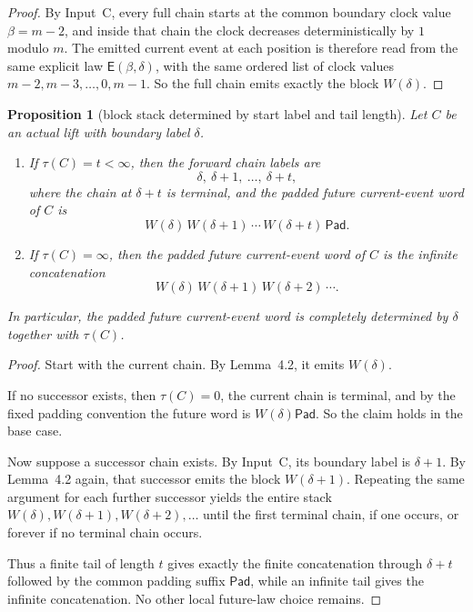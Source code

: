 \documentclass[11pt]{article}
\newtheorem{proposition}[theorem]{Proposition}
\newcommand{\Pad}{\mathsf{Pad}}
\newcommand{\Ev}{\mathsf E}
\begin{document}
\begin{proof}
By Input~C, every full chain starts at the common boundary clock value
$\beta=m-2$, and inside that chain the clock decreases deterministically by $1$
modulo $m$. The emitted current event at each position is therefore read from
the same explicit law $\Ev(\beta,\delta)$, with the same ordered list of clock
values $m-2,m-3,\dots,0,m-1$. So the full chain emits exactly the block
$W(\delta)$.
\end{proof}

\begin{proposition}[block stack determined by start label and tail length]
Let $C$ be an actual lift with boundary label $\delta$.
\begin{enumerate}[label=\textup{(\arabic*)},leftmargin=2.5em]
\item If $\tau(C)=t<\infty$, then the forward chain labels are
      \[
      \delta,\ \delta+1,\ \dots,\ \delta+t,
      \]
      where the chain at $\delta+t$ is terminal, and the padded future
      current-event word of $C$ is
      \[
      W(\delta)\,W(\delta+1)\,\cdots\,W(\delta+t)\,\Pad.
      \]
\item If $\tau(C)=\infty$, then the padded future current-event word of $C$ is
      the infinite concatenation
      \[
      W(\delta)\,W(\delta+1)\,W(\delta+2)\,\cdots.
      \]
\end{enumerate}
In particular, the padded future current-event word is completely determined by
$\delta$ together with $\tau(C)$.
\end{proposition}

\begin{proof}
Start with the current chain. By Lemma~4.2, it emits $W(\delta)$.

If no successor exists, then $\tau(C)=0$, the current chain is terminal, and by
the fixed padding convention the future word is $W(\delta)\Pad$. So the claim
holds in the base case.

Now suppose a successor chain exists. By Input~C, its boundary label is
$\delta+1$. By Lemma~4.2 again, that successor emits the block $W(\delta+1)$.
Repeating the same argument for each further successor yields the entire stack
$W(\delta),W(\delta+1),W(\delta+2),\dots$ until the first terminal chain, if
one occurs, or forever if no terminal chain occurs.

Thus a finite tail of length $t$ gives exactly the finite concatenation through
$\delta+t$ followed by the common padding suffix $\Pad$, while an infinite tail
gives the infinite concatenation. No other local future-law choice remains.
\end{proof}
\end{document}
